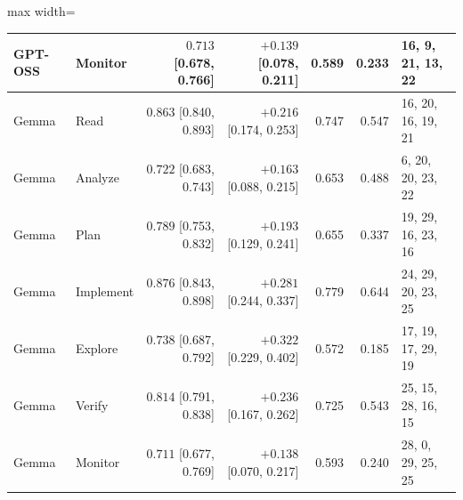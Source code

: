 \begin{table}[!ht]
\begin{adjustbox}{max width=\linewidth}
\begin{tabular}{llrrrrl}
GPT-OSS & Monitor & $0.713$ [0.678, 0.766] & $+0.139$ [0.078, 0.211] & 0.589 & 0.233 & 16, 9, 21, 13, 22 \\
\midrule
Gemma & Read & $0.863$ [0.840, 0.893] & $+0.216$ [0.174, 0.253] & 0.747 & 0.547 & 16, 20, 16, 19, 21 \\
Gemma & Analyze & $0.722$ [0.683, 0.743] & $+0.163$ [0.088, 0.215] & 0.653 & 0.488 & 6, 20, 20, 23, 22 \\
Gemma & Plan & $0.789$ [0.753, 0.832] & $+0.193$ [0.129, 0.241] & 0.655 & 0.337 & 19, 29, 16, 23, 16 \\
Gemma & Implement & $0.876$ [0.843, 0.898] & $+0.281$ [0.244, 0.337] & 0.779 & 0.644 & 24, 29, 20, 23, 25 \\
Gemma & Explore & $0.738$ [0.687, 0.792] & $+0.322$ [0.229, 0.402] & 0.572 & 0.185 & 17, 19, 17, 29, 19 \\
Gemma & Verify & $0.814$ [0.791, 0.838] & $+0.236$ [0.167, 0.262] & 0.725 & 0.543 & 25, 15, 28, 16, 15 \\
Gemma & Monitor & $0.711$ [0.677, 0.769] & $+0.138$ [0.070, 0.217] & 0.593 & 0.240 & 28, 0, 29, 25, 25 \\
\bottomrule
\end{tabular}
\end{adjustbox}
\end{table}
